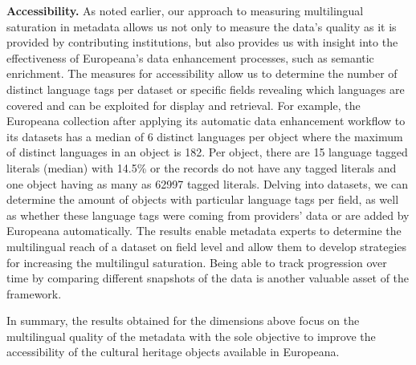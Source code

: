 \noindent\textbf{Accessibility.}
As noted earlier, our approach to measuring multilingual saturation in metadata allows us not only to measure the data's quality as it is provided by contributing institutions, but also provides us with insight into the effectiveness of Europeana's data enhancement processes, such as semantic enrichment. The measures for accessibility allow us to determine the number of distinct language tags per dataset or specific fields revealing which languages are covered and can be exploited for display and retrieval. For example, the Europeana collection after applying its automatic data enhancement workflow to its datasets has a median of 6 distinct languages per object where the maximum of distinct languages in an object is 182. Per object, there are 15 language tagged literals (median) with 14.5\% or the records do not have any tagged literals and one object having as many as 62997 tagged literals.
Delving into datasets, we can determine the amount of objects with particular language tags per field, as well as whether these language tags were coming from providers' data or are added by Europeana automatically.
The results enable metadata experts to determine the multilingual reach of a dataset on field level and allow them to develop strategies for increasing the multilingul saturation. Being able to track progression over time by comparing different snapshots of the data is another valuable asset of the framework. 

In summary, the results obtained for the dimensions above focus on the multilingual quality of the metadata with the sole objective to improve the accessibility of the cultural heritage objects available in Europeana. 




